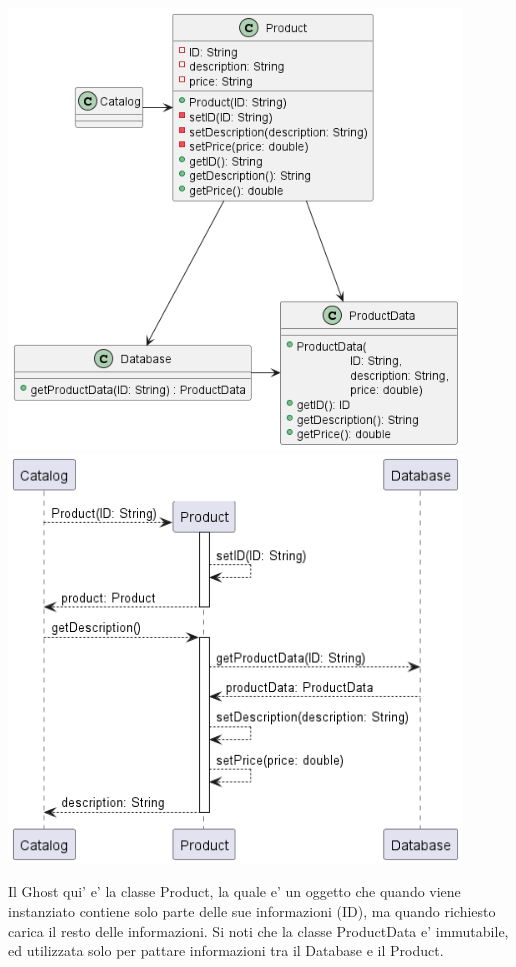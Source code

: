 \begin{center}
    \includegraphics[width=12cm]{images/lazy-load/ProductClass.png}
    \includegraphics[width=12cm]{images/lazy-load/ProductSD.png}
\end{center}

Il Ghost qui' e' la classe Product, la quale e' un oggetto che quando viene instanziato contiene solo parte delle sue informazioni (ID), ma quando richiesto carica il resto delle informazioni.
Si noti che la classe ProductData e' immutabile, ed utilizzata solo per pattare informazioni tra il Database e il Product.
